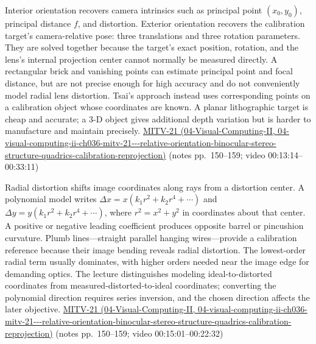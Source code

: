 Interior orientation recovers camera intrinsics such as principal point \((x_0,y_0)\), principal distance \(f\), and distortion. Exterior orientation recovers the calibration target's camera-relative pose: three translations and three rotation parameters. They are solved together because the target's exact position, rotation, and the lens's internal projection center cannot normally be measured directly. A rectangular brick and vanishing points can estimate principal point and focal distance, but are not precise enough for high accuracy and do not conveniently model radial lens distortion. Tsai's approach instead uses corresponding points on a calibration object whose coordinates are known. A planar lithographic target is cheap and accurate; a 3-D object gives additional depth variation but is harder to manufacture and maintain precisely. \href{../04-Visual-Computing-II/main.pdf\#nameddest=04-visual-computing-ii-ch036-mitv-21---relative-orientation-binocular-stereo-structure-quadrics-calibration-reprojection}{MITV-21 (04-Visual-Computing-II, 04-visual-computing-ii-ch036-mitv-21-\/-\/-relative-orientation-binocular-stereo-structure-quadrics-calibration-reprojection)} (notes pp.~150--159; video 00:13:14--00:33:11)

Radial distortion shifts image coordinates along rays from a distortion center. A polynomial model writes \(\Delta x=x(k_1r^2+k_2r^4+\cdots)\) and \(\Delta y=y(k_1r^2+k_2r^4+\cdots)\), where \(r^2=x^2+y^2\) in coordinates about that center. A positive or negative leading coefficient produces opposite barrel or pincushion curvature. Plumb lines---straight parallel hanging wires---provide a calibration reference because their image bending reveals radial distortion. The lowest-order radial term usually dominates, with higher orders needed near the image edge for demanding optics. The lecture distinguishes modeling ideal-to-distorted coordinates from measured-distorted-to-ideal coordinates; converting the polynomial direction requires series inversion, and the chosen direction affects the later objective. \href{../04-Visual-Computing-II/main.pdf\#nameddest=04-visual-computing-ii-ch036-mitv-21---relative-orientation-binocular-stereo-structure-quadrics-calibration-reprojection}{MITV-21 (04-Visual-Computing-II, 04-visual-computing-ii-ch036-mitv-21-\/-\/-relative-orientation-binocular-stereo-structure-quadrics-calibration-reprojection)} (notes pp.~150--159; video 00:15:01--00:22:32)

